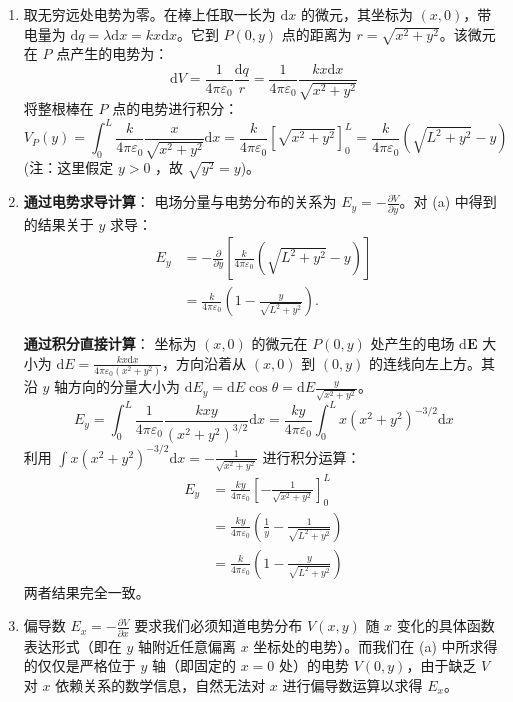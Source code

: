 \begin{solution}
\begin{enumerate}
  \item[(a)] 取无穷远处电势为零。在棒上任取一长为 $\mathrm{d}x$ 的微元，其坐标为 $(x, 0)$，带电量为 $\mathrm{d}q = \lambda \mathrm{d}x = kx \mathrm{d}x$。它到 $P(0, y)$ 点的距离为 $r = \sqrt{x^2 + y^2}$。该微元在 $P$ 点产生的电势为：
  $$ \mathrm{d}V = \frac{1}{4\pi\varepsilon_0} \frac{\mathrm{d}q}{r} = \frac{1}{4\pi\varepsilon_0} \frac{kx \mathrm{d}x}{\sqrt{x^2 + y^2}} $$
  将整根棒在 $P$ 点的电势进行积分：
  $$ V_P(y) = \int_0^L \frac{k}{4\pi\varepsilon_0} \frac{x}{\sqrt{x^2 + y^2}} \mathrm{d}x = \frac{k}{4\pi\varepsilon_0} \left[ \sqrt{x^2 + y^2} \right]_0^L = \frac{k}{4\pi\varepsilon_0} \left( \sqrt{L^2 + y^2} - y \right) $$
  (注：这里假定 $y>0$ ，故 $\sqrt{y^2} = y$)。

  \item[(b)] \textbf{通过电势求导计算}：
  电场分量与电势分布的关系为 $E_y = -\frac{\partial V}{\partial y}$。对 (a) 中得到的结果关于 $y$ 求导：
  \[
  \begin{aligned}
  E_y&=-\frac{\partial}{\partial y}
      \left[\frac{k}{4\pi\varepsilon_0}(\sqrt{L^2+y^2}-y)\right]\\
     &=\frac{k}{4\pi\varepsilon_0}
      \left(1-\frac{y}{\sqrt{L^2+y^2}}\right).
  \end{aligned}
  \]

  \textbf{通过积分直接计算}：
  坐标为 $(x, 0)$ 的微元在 $P(0, y)$ 处产生的电场 $\mathrm{d}\boldsymbol{E}$ 大小为 $\mathrm{d}E = \frac{kx \mathrm{d}x}{4\pi\varepsilon_0 (x^2 + y^2)}$，方向沿着从 $(x,0)$ 到 $(0,y)$ 的连线向左上方。其沿 $y$ 轴方向的分量大小为 $\mathrm{d}E_y = \mathrm{d}E \cos\theta = \mathrm{d}E \frac{y}{\sqrt{x^2 + y^2}}$。
  $$ E_y = \int_0^L \frac{1}{4\pi\varepsilon_0} \frac{kxy}{(x^2 + y^2)^{3/2}} \mathrm{d}x = \frac{ky}{4\pi\varepsilon_0} \int_0^L x(x^2 + y^2)^{-3/2} \mathrm{d}x $$
  利用 $\int x(x^2 + y^2)^{-3/2} \mathrm{d}x = -\frac{1}{\sqrt{x^2 + y^2}}$ 进行积分运算：
  \[
  \begin{aligned}
  E_y &= \frac{ky}{4\pi\varepsilon_0} \left[ -\frac{1}{\sqrt{x^2 + y^2}} \right]_0^L\\
    &= \frac{ky}{4\pi\varepsilon_0} \left( \frac{1}{y} - \frac{1}{\sqrt{L^2 + y^2}} \right)\\
    &= \frac{k}{4\pi\varepsilon_0} \left( 1 - \frac{y}{\sqrt{L^2 + y^2}} \right)
  \end{aligned}
  \]
  两者结果完全一致。

  \item[(c)] 偏导数 $E_x = -\frac{\partial V}{\partial x}$ 要求我们必须知道电势分布 $V(x, y)$ 随 $x$ 变化的具体函数表达形式（即在 $y$ 轴附近任意偏离 $x$ 坐标处的电势）。而我们在 (a) 中所求得的仅仅是严格位于 $y$ 轴（即固定的 $x=0$ 处）的电势 $V(0, y)$，由于缺乏 $V$ 对 $x$ 依赖关系的数学信息，自然无法对 $x$ 进行偏导数运算以求得 $E_x$。
\end{enumerate}
\end{solution}

